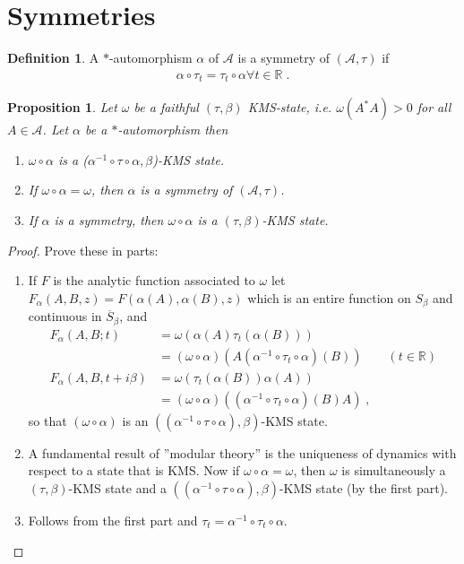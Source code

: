 \documentclass[
a4paper, %
11pt, %
onecolumn, %
openany, %
]{memoir}
\theoremstyle{definition}
\newtheorem{definition}{Definition}[chapter]
\theoremstyle{remark}
\theoremstyle{plain}
\newtheorem{prop}{Proposition}[chapter]
\begin{document}
\section{Symmetries}
\begin{definition}
A $*$-automorphism $\alpha$ of $\mathcal{A}$ is a symmetry of $(\mathcal{A},\tau)$ if \begin{align}
\alpha\circ\tau_t=\tau_t\circ \alpha \forall t \in \mathbb{R}\; .
\end{align}
\end{definition}
\begin{prop}
Let $\omega$ be a faithful $(\tau,\beta)$ KMS-state, i.e. $\omega(A^*A)>0$ for all $A\in\mathcal{A}$. Let $\alpha$ be a $*$-automorphism then \begin{enumerate}
\item $\omega\circ\alpha$ is a ($\alpha^{-1}\circ\tau\circ\alpha,\beta$)-KMS state.
\item If $\omega\circ \alpha = \omega$, then $\alpha$ is a symmetry of $(\mathcal{A},\tau)$.
\item If $\alpha$ is a symmetry, then $\omega\circ\alpha$ is a $(\tau,\beta)$-KMS state.
\end{enumerate}
\end{prop}
\begin{proof}
Prove these in parts: 
\begin{enumerate}
\item If $F$ is the analytic function associated to $\omega$ let $F_{\alpha}(A,B,z)=F(\alpha(A),\alpha(B),z)$ which is an entire function on $S_{\beta}$ and continuous in $\overline{S}_{\beta}$, and \begin{align}
F_{\alpha}(A,B; t)&=\omega(\alpha(A)\tau_t(\alpha(B)))\\
&=(\omega\circ \alpha)(A(\alpha^{-1}\circ\tau_t\circ\alpha)(B))\qquad (t\in\mathbb{R})\\
F_{\alpha}(A,B,t+i\beta)&=\omega(\tau_t(\alpha(B))\alpha(A))\\
&=(\omega\circ\alpha)((\alpha^{-1}\circ\tau_t\circ\alpha)(B)A)\; ,
\end{align}
so that $(\omega\circ\alpha)$ is an $((\alpha^{-1}\circ\tau\circ\alpha),\beta)$-KMS state.
\item A fundamental result of ''modular theory'' is the uniqueness of dynamics with respect to a state that is KMS. Now if $\omega\circ\alpha=\omega$, then $\omega$ is simultaneously a $(\tau,\beta)$-KMS state and a $((\alpha^{-1}\circ\tau\circ\alpha),\beta)$-KMS state (by the first part).
\item Follows from the first part and $\tau_t=\alpha^{-1}\circ\tau_t\circ\alpha$.
\end{enumerate}
\end{proof}
\end{document}
